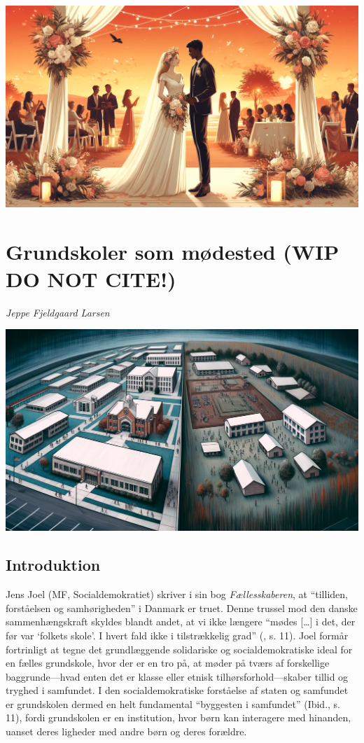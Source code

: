 \documentclass[
]{book}
\begin{document}
\includegraphics[width=1\linewidth]{images/dalle-wedding}

\chapter{\texorpdfstring{Grundskoler som mødested (\textbf{WIP DO NOT CITE!})}{Grundskoler som mødested (WIP DO NOT CITE!)}}\label{kap3}

\emph{Jeppe Fjeldgaard Larsen}

\includegraphics[width=1\linewidth]{images/dalle-schoolseg}

\section{Introduktion}\label{introduktion}

Jens Joel (MF, Socialdemokratiet) skriver i sin bog \emph{Fællesskaberen}, at ``tilliden, forståelsen og samhørigheden'' i Danmark er truet. Denne trussel mod den danske sammenhængskraft skyldes blandt andet, at vi ikke længere ``mødes {[}\ldots{]} i det, der før var `folkets skole'. I hvert fald ikke i tilstrækkelig grad'' (, s. 11). Joel formår fortrinligt at tegne det grundlæggende solidariske og socialdemokratiske ideal for en fælles grundskole, hvor der er en tro på, at møder på tværs af forskellige baggrunde---hvad enten det er klasse eller etnisk tilhørsforhold---skaber tillid og tryghed i samfundet. I den socialdemokratiske forståelse af staten og samfundet er grundskolen dermed en helt fundamental ``byggesten i samfundet'' (Ibid., s. 11), fordi grundskolen er en institution, hvor børn kan interagere med hinanden, uanset deres ligheder med andre børn og deres forældre.
\end{document}
